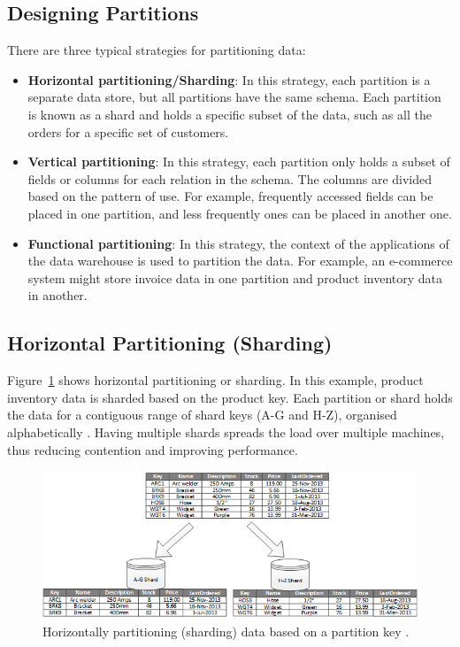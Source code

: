 \subsection{Designing Partitions}
There are three typical strategies for partitioning data:
\begin{itemize}
    \item \textbf{Horizontal partitioning/Sharding}: In this strategy, each partition is a separate data store, but all partitions have the same schema. Each partition is known as a shard and holds a specific subset of the data, such as all the orders for a specific set of customers.
    \item \textbf{Vertical partitioning}: In this strategy, each partition only holds a subset of fields or columns for each relation in the schema. The columns are divided based on the pattern of use. For example, frequently accessed fields can be placed in one partition, and less frequently ones can be placed in another one.
    \item \textbf{Functional partitioning}: In this strategy, the context of the applications of the data warehouse is used to partition the data. For example, an e-commerce system might store invoice data in one partition and product inventory data in another.
    
\end{itemize}

\subsection{Horizontal Partitioning (Sharding)}
Figure~\ref{fig:horizontal-partitioning} shows horizontal partitioning or sharding. In this example, product inventory data is sharded based on the product key. Each partition or shard holds the data for a contiguous range of shard keys (A-G and H-Z), organised alphabetically \cite{Datapart51:online}. Having multiple shards spreads the load over multiple machines, thus reducing contention and improving performance.

\begin{figure}[h]
  \centering
  \includegraphics[width=\linewidth]{figures/horiziontal-partitoning.png}
  \caption{Horizontally partitioning (sharding) data based on a partition key \cite{Datapart51:online}.}
  \label{fig:horizontal-partitioning}

\end{figure}

